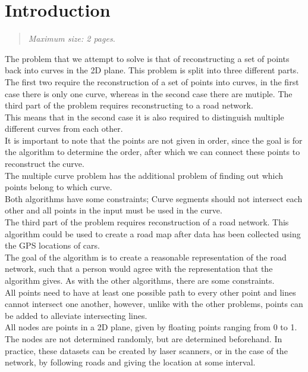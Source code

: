 \documentclass[11pt]{article}
\newcommand{\maxsize}[1]{\begin{quotation} {\sl \noindent Maximum size: #1.} \end{quotation}}
\begin{document}
\section{Introduction}
\label{se:introduction}
\maxsize{2 pages}
The problem that we attempt to solve is that of reconstructing a set of points back into curves in the 2D plane. 
This problem is split into three different parts. The first two require the reconstruction of a set of points into curves, in the first case there is only one curve, whereas in the second case there are mutiple. The third part of the problem requires reconstructing to a road network.\\
This means that in the second case it is also required to distinguish multiple different curves from each other.\\
 It is important to note that the points are not given in order, since the goal is for the algorithm to determine the order, after which we can connect these points to reconstruct the curve.\\
 The multiple curve problem has the additional problem of finding out which points belong to which curve.\\
 Both algorithms have some constraints; Curve segments should not intersect each other and all points in the input must be used in the curve.\\
The third part of the problem requires reconstruction of a road network. This algorithm could be used to create a road map after data has been collected using the GPS locations of cars.\\
The goal of the algorithm is to create a reasonable representation of the road network, such that a person would agree with the representation that the algorithm gives. As with the other algorithms, there are some constraints.\\
All points need to have at least one possible path to every other point and lines cannot intersect one another, however, unlike with the other problems, points can be added to alleviate intersecting lines.\\
All nodes are points in a 2D plane, given by floating points ranging from 0 to 1. 
The nodes are not determined randomly, but are determined beforehand. In practice, these datasets can be created by laser scanners, or in the case of the network, by following roads and giving the location at some interval.\\
\end{document}
